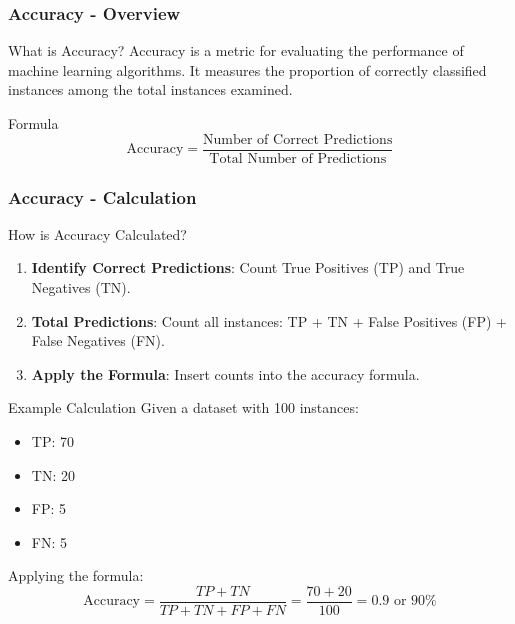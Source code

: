 \documentclass[aspectratio=169]{beamer}
\begin{document}
\begin{frame}[fragile]
    \frametitle{Accuracy - Overview}
    \begin{block}{What is Accuracy?}
        Accuracy is a metric for evaluating the performance of machine learning algorithms. It measures the proportion of correctly classified instances among the total instances examined. 
    \end{block}
    \begin{block}{Formula}
        \begin{equation}
        \text{Accuracy} = \frac{\text{Number of Correct Predictions}}{\text{Total Number of Predictions}} 
        \end{equation}
    \end{block}
\end{frame}

\begin{frame}[fragile]
    \frametitle{Accuracy - Calculation}
    \begin{block}{How is Accuracy Calculated?}
        \begin{enumerate}
            \item \textbf{Identify Correct Predictions}: Count True Positives (TP) and True Negatives (TN).
            \item \textbf{Total Predictions}: Count all instances: TP + TN + False Positives (FP) + False Negatives (FN).
            \item \textbf{Apply the Formula}: Insert counts into the accuracy formula.
        \end{enumerate}
    \end{block}
    \begin{block}{Example Calculation}
        Given a dataset with 100 instances:
        \begin{itemize}
            \item TP: 70
            \item TN: 20
            \item FP: 5
            \item FN: 5
        \end{itemize}
        Applying the formula:
        \begin{equation}
        \text{Accuracy} = \frac{TP + TN}{TP + TN + FP + FN} = \frac{70 + 20}{100} = 0.9 \text{ or } 90\%
        \end{equation}
    \end{block}
\end{frame}
\end{document}
